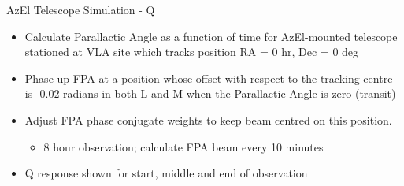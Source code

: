 \documentclass[pdf,azure,slideColor,colorBG]{prosper}
\begin{document}

\begin{slide} {AzEl Telescope Simulation - Q}
\begin{small}
\begin{itemize}
\item Calculate Parallactic Angle as a function of time for AzEl-mounted
telescope stationed at VLA site which tracks position RA = 0 hr, Dec = 0 deg
\item Phase up FPA at a position whose offset with respect to the
tracking centre is -0.02 radians in both L and M when the Parallactic Angle is zero (transit)
\item Adjust FPA phase conjugate weights to keep beam centred on this
position.
\begin{itemize}
\item 8 hour observation; calculate FPA beam every 10 minutes
\end{itemize}
\item Q response shown for start, middle and end of observation 
\end{itemize}
\end {small}
{\centering
{}
}
\end{slide}
\end{document}
